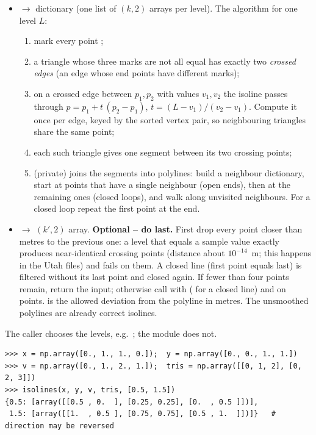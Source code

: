 \documentclass{article}
\begin{document}
\begin{itemize}
\item {} $\to$ dictionary
       (one list of $(k,2)$ arrays per level).
      The algorithm for one level $L$:
      \begin{enumerate}
      \item mark every point ;
      \item a triangle whose three marks are not all equal has exactly two
            \emph{crossed edges} (an edge whose end points have different marks);
      \item on a crossed edge between $p_1,p_2$ with values $v_1,v_2$ the
            isoline passes through $p=p_1+t\,(p_2-p_1)$,
            $t=(L-v_1)/(v_2-v_1)$. Compute it once per edge, keyed by the sorted
            vertex pair, so neighbouring triangles share the same point;
      \item each such triangle gives one segment between its two crossing
            points;
      \item {} (private) joins the segments into
            polylines: build a neighbour dictionary, start at points that have a
            single neighbour (open ends), then at the remaining ones (closed
            loops), and walk along unvisited neighbours. For a closed loop repeat
            the first point at the end.
      \end{enumerate}
\item {}
      $\to$ $(k',2)$ array. \textbf{Optional -- do last.} First drop every point
      closer than  metres to the previous one: a level that equals a
      sample value exactly produces near-identical crossing points (distance
      about $10^{-14}$~m; this happens in the Utah files) and 
      fails on them. A closed line (first point equals last) is filtered
      without its last point and closed again. If fewer than four points remain,
      return the input; otherwise call  with
       ( for a closed line) and
       on  points.  is the
      allowed deviation from the polyline in metres. The unsmoothed polylines
      are already correct isolines.
\end{itemize}
The caller chooses the levels, e.g.\ ;
the module does not.
\begin{lstlisting}
>>> x = np.array([0., 1., 1., 0.]);  y = np.array([0., 0., 1., 1.])
>>> v = np.array([0., 1., 2., 1.]);  tris = np.array([[0, 1, 2], [0, 2, 3]])
>>> isolines(x, y, v, tris, [0.5, 1.5])
{0.5: [array([[0.5 , 0.  ], [0.25, 0.25], [0.  , 0.5 ]])],
 1.5: [array([[1.  , 0.5 ], [0.75, 0.75], [0.5 , 1.  ]])]}   # direction may be reversed
\end{lstlisting}
\end{document}
